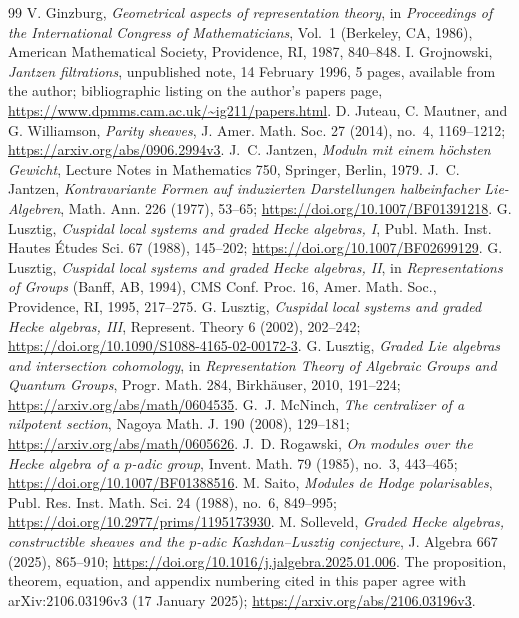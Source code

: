 \documentclass[10pt,a4paper]{amsart}
\begin{document}
\begin{thebibliography}{99}
 V. Ginzburg, \emph{Geometrical aspects of representation theory}, in \emph{Proceedings of the International Congress of Mathematicians}, Vol.~1 (Berkeley, CA, 1986), American Mathematical Society, Providence, RI, 1987, 840--848.
 I. Grojnowski, \emph{Jantzen filtrations}, unpublished note, 14 February 1996, 5 pages, available from the author; bibliographic listing on the author's papers page, \url{https://www.dpmms.cam.ac.uk/~ig211/papers.html}.
 D. Juteau, C. Mautner, and G. Williamson, \emph{Parity sheaves}, J. Amer. Math. Soc. 27 (2014), no.~4, 1169--1212; \url{https://arxiv.org/abs/0906.2994v3}.
 J.~C. Jantzen, \emph{Moduln mit einem h\"ochsten Gewicht}, Lecture Notes in Mathematics 750, Springer, Berlin, 1979.
 J.~C. Jantzen, \emph{Kontravariante Formen auf induzierten Darstellungen halbeinfacher Lie-Algebren}, Math. Ann. 226 (1977), 53--65; \url{https://doi.org/10.1007/BF01391218}.
 G. Lusztig, \emph{Cuspidal local systems and graded Hecke algebras, I}, Publ. Math. Inst. Hautes \'Etudes Sci. 67 (1988), 145--202; \url{https://doi.org/10.1007/BF02699129}.
 G. Lusztig, \emph{Cuspidal local systems and graded Hecke algebras, II}, in \emph{Representations of Groups} (Banff, AB, 1994), CMS Conf. Proc. 16, Amer. Math. Soc., Providence, RI, 1995, 217--275.
 G. Lusztig, \emph{Cuspidal local systems and graded Hecke algebras, III}, Represent. Theory 6 (2002), 202--242; \url{https://doi.org/10.1090/S1088-4165-02-00172-3}.
 G. Lusztig, \emph{Graded Lie algebras and intersection cohomology}, in \emph{Representation Theory of Algebraic Groups and Quantum Groups}, Progr. Math. 284, Birkh\"auser, 2010, 191--224; \url{https://arxiv.org/abs/math/0604535}.
 G.~J. McNinch, \emph{The centralizer of a nilpotent section}, Nagoya Math. J. 190 (2008), 129--181; \url{https://arxiv.org/abs/math/0605626}.
 J.~D. Rogawski, \emph{On modules over the Hecke algebra of a $p$-adic group}, Invent. Math. 79 (1985), no.~3, 443--465; \url{https://doi.org/10.1007/BF01388516}.
 M. Saito, \emph{Modules de Hodge polarisables}, Publ. Res. Inst. Math. Sci. 24 (1988), no.~6, 849--995; \url{https://doi.org/10.2977/prims/1195173930}.
 M. Solleveld, \emph{Graded Hecke algebras, constructible sheaves and the $p$-adic Kazhdan--Lusztig conjecture}, J. Algebra 667 (2025), 865--910; \url{https://doi.org/10.1016/j.jalgebra.2025.01.006}. The proposition, theorem, equation, and appendix numbering cited in this paper agree with arXiv:2106.03196v3 (17 January 2025); \url{https://arxiv.org/abs/2106.03196v3}.

\end{thebibliography}
\end{document}
